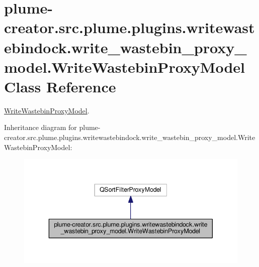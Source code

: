\hypertarget{classplume-creator_1_1src_1_1plume_1_1plugins_1_1writewastebindock_1_1write__wastebin__proxy__moe56e22e3e5d294c2c5a878e7ed44fa84}{}\section{plume-\/creator.src.\+plume.\+plugins.\+writewastebindock.\+write\+\_\+wastebin\+\_\+proxy\+\_\+model.\+Write\+Wastebin\+Proxy\+Model Class Reference}
\label{classplume-creator_1_1src_1_1plume_1_1plugins_1_1writewastebindock_1_1write__wastebin__proxy__moe56e22e3e5d294c2c5a878e7ed44fa84}


\hyperlink{classplume-creator_1_1src_1_1plume_1_1plugins_1_1writewastebindock_1_1write__wastebin__proxy__moe56e22e3e5d294c2c5a878e7ed44fa84}{Write\+Wastebin\+Proxy\+Model}.  




Inheritance diagram for plume-\/creator.src.\+plume.\+plugins.\+writewastebindock.\+write\+\_\+wastebin\+\_\+proxy\+\_\+model.\+Write\+Wastebin\+Proxy\+Model\+:\nopagebreak
\begin{figure}[H]
\begin{center}
\leavevmode
\includegraphics[width=343pt]{classplume-creator_1_1src_1_1plume_1_1plugins_1_1writewastebindock_1_1write__wastebin__proxy__mo0cb12875fb6600deba3c40ed2617f6d4}
\end{center}
\end{figure}


